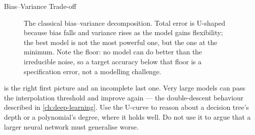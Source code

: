 \begin{v3topic}{Bias--Variance Trade-off}
\begin{figure}[htbp]
\centering
{}
\caption{The classical bias--variance decomposition. Total error is U-shaped
because bias falls and variance rises as the model gains flexibility; the best
model is not the most powerful one, but the one at the minimum. Note the floor:
no model can do better than the irreducible noise, so a target accuracy below
that floor is a specification error, not a modelling challenge.}
\label{fig:ml-bias-variance}
\end{figure}

\begin{cautionbox}
 is the right first picture and an incomplete last
one. Very large models can pass the interpolation threshold and improve again
--- the double-descent behaviour described in
\cref{ch:deep-learning}. Use the U-curve to reason about a decision tree's
depth or a polynomial's degree, where it holds well. Do not use it to argue
that a larger neural network must generalise worse.
\end{cautionbox}

\end{v3topic}
